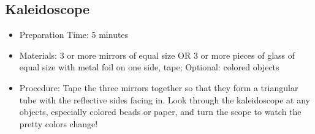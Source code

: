 \subsection{Kaleidoscope}
\begin{itemize}
\item{Preparation Time: 5 minutes}
\item{Materials: 3 or more mirrors of equal size OR 3 or more pieces of glass of equal size with metal foil on one side, tape; Optional: colored objects}
\item{Procedure: Tape the three mirrors together so that they form a triangular tube with the reflective sides facing in. Look through the kaleidoscope at any objects, especially colored beads or paper, and turn the scope to watch the pretty colors change!}
\end{itemize}


